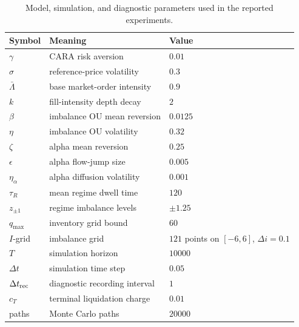 \documentclass[11pt,a4paper]{article}
\theoremstyle{plain}
\theoremstyle{definition}
\begin{document}
\begin{table}[htbp]
\centering
\caption{Model, simulation, and diagnostic parameters used in the reported
experiments.}
\label{tab:parameters}
\begin{tabular}{lll}
\hline
Symbol & Meaning & Value\\
\hline
\(\gamma\) & CARA risk aversion & \(0.01\)\\
\(\sigma\) & reference-price volatility & \(0.3\)\\
\(\bar\Lambda\) & base market-order intensity & \(0.9\)\\
\(k\) & fill-intensity depth decay & \(2\)\\
\(\beta\) & imbalance OU mean reversion & \(0.0125\)\\
\(\eta\) & imbalance OU volatility & \(0.32\)\\
\(\zeta\) & alpha mean reversion & \(0.25\)\\
\(\epsilon\) & alpha flow-jump size & \(0.005\)\\
\(\eta_\alpha\) & alpha diffusion volatility & \(0.001\)\\
\(\tau_R\) & mean regime dwell time & \(120\)\\
\(z_{\pm1}\) & regime imbalance levels & \(\pm1.25\)\\
\(q_{\max}\) & inventory grid bound & \(60\)\\
\(I\)-grid & imbalance grid & \(121\) points on \([-6,6]\), \(\Delta i=0.1\)\\
\(T\) & simulation horizon & \(10000\)\\
\(\Delta t\) & simulation time step & \(0.05\)\\
\(\Delta t_{\rm rec}\) & diagnostic recording interval & \(1\)\\
\(c_T\) & terminal liquidation charge & \(0.01\)\\
paths & Monte Carlo paths & \(20000\)\\
\hline
\end{tabular}
\end{table}
\end{document}
